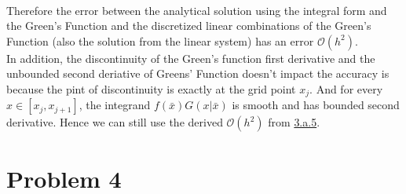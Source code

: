 \documentclass[]{article}
\begin{document}
        \\
        Therefore the error between the analytical solution using the integral form and the Green's Function and the discretized linear combinations of the Green's Function (also the solution from the linear system) has an error $\mathcal{O}(h^2)$. 
        \\
        In addition, the discontinuity of the Green's function first derivative and the unbounded second deriative of Greens' Function doesn't impact the accuracy is because the pint of discontinuity is exactly at the grid point $x_j$. And for every $x\in[x_j, x_{j + 1}]$, the integrand $f(\bar{x})G(x|\bar{x})$ is smooth and has bounded second derivative. Hence we can still use the derived $\mathcal{O}(h^2)$ from \hyperref[eqn:3.a.5]{3.a.5}. 
\section*{Problem 4}
\end{document}
